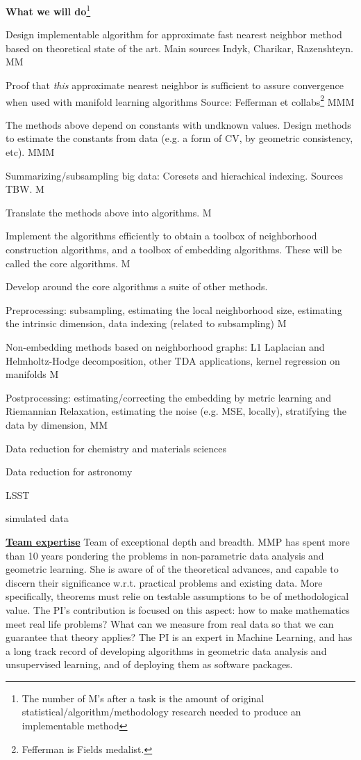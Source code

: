 \documentclass[floatfix,11pt]{article}
\begin{document}
{\bf What we will do}\footnote{The number of M's after a task is the amount of original statistical/algorithm/methodology research needed to produce an implementable method}
\bit
\item Design implementable algorithm for approximate fast nearest neighbor method based on theoretical state of the art. Main sources Indyk, Charikar, Razenshteyn. MM
\item Proof that {\em this} approximate nearest neighbor is sufficient to assure convergence when used with manifold learning algorithms Source: Fefferman et collabs\footnote{Fefferman is Fields medalist.} MMM
\item The methods above depend on constants with undknown values. Design methods to estimate the constants from data (e.g. a form of CV, by geometric consistency, etc). MMM
\item Summarizing/subsampling big data: Coresets and hierachical indexing. Sources TBW. M 
\item Translate the methods above into algorithms. M
\item Implement the algorithms efficiently to obtain a toolbox of neighborhood construction algorithms, and a toolbox of embedding algorithms. These will be called the core algorithms. M
\item Develop around the core algorithms a suite of other methods.
 \bit
 \item Preprocessing: subsampling, estimating the local neighborhood size, estimating the intrinsic dimension, data indexing (related to subsampling) M
 \item Non-embedding methods based on neighborhood graphs: L1 Laplacian and Helmholtz-Hodge decomposition, other TDA applications, kernel regression on manifolds M
 \item Postprocessing: estimating/correcting the embedding by metric learning and Riemannian Relaxation, estimating the noise (e.g. MSE, locally), stratifying the data by dimension, MM
   \eit
 \item Data reduction for chemistry and materials sciences
 \item Data reduction for astronomy 
   \bit
 \item LSST
 \item simulated data
   \eit
 \eit


\underline{\bf Team expertise} Team of exceptional depth and breadth.
MMP has spent more than 10 years pondering the problems in non-parametric data analysis and geometric learning. She is aware of of the theoretical advances, and capable to discern their significance w.r.t. practical problems and existing data. More specifically, theorems must relie on testable assumptions to be of methodological value. The PI's contribution is focused on this aspect: how to make mathematics meet real life problems? What can we measure from real data so that we can guarantee that theory applies?
The PI is an expert in Machine Learning, and has a long track record of developing algorithms in geometric data analysis and unsupervised learning, and of deploying them as software packages.
\end{document}

